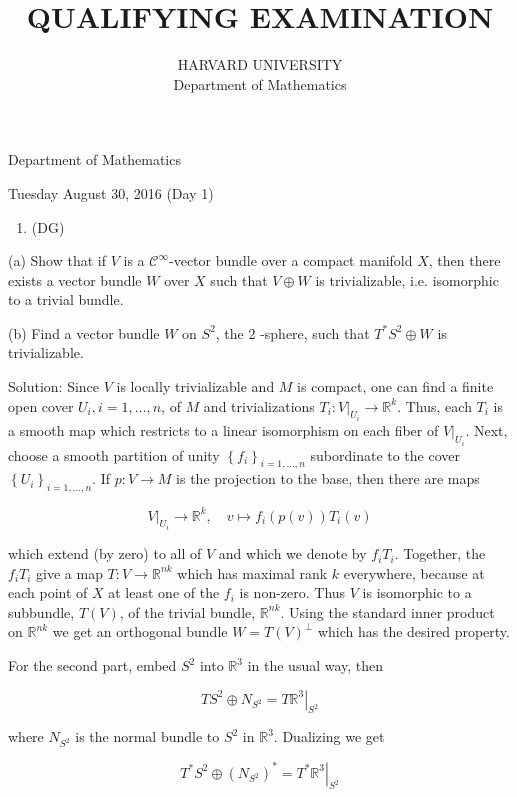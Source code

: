 \documentclass[10pt]{article}
\title{QUALIFYING EXAMINATION }
\author{HARVARD UNIVERSITY\\
Department of Mathematics}
\date{}
\begin{document}
\maketitle
Department of Mathematics

Tuesday August 30, 2016 (Day 1)

\begin{enumerate}
  \item (DG)
\end{enumerate}

(a) Show that if $V$ is a $\mathcal{C}^{\infty}$-vector bundle over a compact manifold $X$, then there exists a vector bundle $W$ over $X$ such that $V \oplus W$ is trivializable, i.e. isomorphic to a trivial bundle.

(b) Find a vector bundle $W$ on $S^{2}$, the 2 -sphere, such that $T^{*} S^{2} \oplus W$ is trivializable.

Solution: Since $V$ is locally trivializable and $M$ is compact, one can find a finite open cover $U_{i}, i=1, \ldots, n$, of $M$ and trivializations $T_{i}:\left.V\right|_{U_{i}} \rightarrow \mathbb{R}^{k}$. Thus, each $T_{i}$ is a smooth map which restricts to a linear isomorphism on each fiber of $\left.V\right|_{U_{i}}$. Next, choose a smooth partition of unity $\left\{f_{i}\right\}_{i=1, \ldots, n}$ subordinate to the cover $\left\{U_{i}\right\}_{i=1, \ldots, n}$. If $p: V \rightarrow M$ is the projection to the base, then there are maps

$$
\left.V\right|_{U_{i}} \rightarrow \mathbb{R}^{k}, \quad v \mapsto f_{i}(p(v)) T_{i}(v)
$$

which extend (by zero) to all of $V$ and which we denote by $f_{i} T_{i}$. Together, the $f_{i} T_{i}$ give a map $T: V \rightarrow \mathbb{R}^{n k}$ which has maximal rank $k$ everywhere, because at each point of $X$ at least one of the $f_{i}$ is non-zero. Thus $V$ is isomorphic to a subbundle, $T(V)$, of the trivial bundle, $\mathbb{R}^{n k}$. Using the standard inner product on $\mathbb{R}^{n k}$ we get an orthogonal bundle $W=T(V)^{\perp}$ which has the desired property.

For the second part, embed $S^{2}$ into $\mathbb{R}^{3}$ in the usual way, then

$$
T S^{2} \oplus N_{S^{2}}=\left.T \mathbb{R}^{3}\right|_{S^{2}}
$$

where $N_{S^{2}}$ is the normal bundle to $S^{2}$ in $\mathbb{R}^{3}$. Dualizing we get

$$
T^{*} S^{2} \oplus\left(N_{S^{2}}\right)^{*}=\left.T^{*} \mathbb{R}^{3}\right|_{S^{2}}
$$
\end{document}
